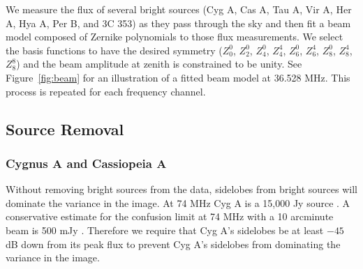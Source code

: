 \documentclass[twocolumn]{aastex61}
\begin{document}
We measure the flux of several bright sources (Cyg A, Cas A, Tau A, Vir A, Her A, Hya A, Per B, and
3C 353) as they pass through the sky and then fit a beam model composed of Zernike polynomials to
those flux measurements. We select the basis functions to have the desired symmetry ($Z_0^0$,
$Z_2^0$, $Z_4^0$, $Z_4^4$, $Z_6^0$, $Z_6^4$, $Z_8^0$, $Z_8^4$, $Z_8^8$) and the beam amplitude at
zenith is constrained to be unity. See Figure~\ref{fig:beam} for an illustration of a fitted beam
model at 36.528 MHz. This process is repeated for each frequency channel.

\subsection{Source Removal}

\subsubsection{Cygnus A and Cassiopeia A}


Without removing bright sources from the data, sidelobes from bright sources will dominate the
variance in the image.  At 74 MHz Cyg A is a 15,000 Jy source \citep{1977A&A....61...99B}. A
conservative estimate for the confusion limit at 74 MHz with a 10 arcminute beam is 500 mJy
\citep{2012RaSc...47.0K04L}. Therefore we require that Cyg A's sidelobes be at least $-45$ dB down
from its peak flux to prevent Cyg A's sidelobes from dominating the variance in the image.
\end{document}
